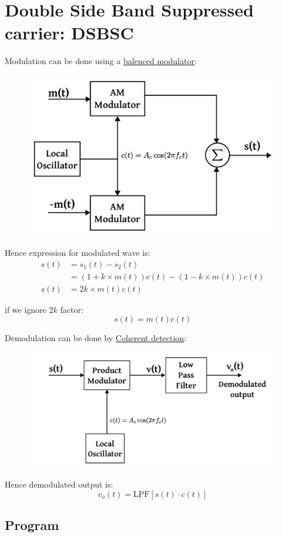 \pagebreak

\section{Double Side Band Suppressed carrier: DSBSC}

Modulation can be done using a \underline{balenced modulator}:

\begin{figure}[H]
	\centering
	\includegraphics[width=.6\textwidth]{img/balanced_modulator.pdf}
\end{figure}
Hence expression for modulated wave is: 
\begin{align*}
	s(t) &= s_1(t) - s_2(t) \\
	 &= (1 + k \times m(t)) c(t) - (1 - k \times m(t)) c(t) \\
	 s(t)    &= 2k \times m(t) c(t)
\end{align*}

if we ignore $2k$ factor: 
$$s(t) = m(t)c(t)$$


Demodulation can be done by \underline{Coherent detection}: 
\begin{figure}[H]
	\centering
	\includegraphics[width=.7\textwidth]{img/coh_detec.pdf}
\end{figure}

Hence demodulated output is: 
$$v_o(t) = \text{LPF}\left[s(t)\cdot c(t)\right]$$

\subsection*{Program}

